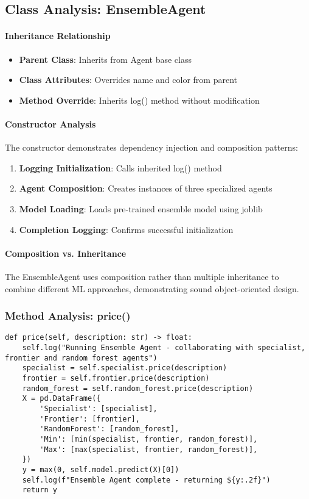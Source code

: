 \subsection{Class Analysis: EnsembleAgent}

\paragraph{Inheritance Relationship}
\begin{itemize}
\item \textbf{Parent Class}: Inherits from Agent base class
\item \textbf{Class Attributes}: Overrides name and color from parent
\item \textbf{Method Override}: Inherits log() method without modification
\end{itemize}

\paragraph{Constructor Analysis}
The constructor demonstrates dependency injection and composition patterns:

\begin{enumerate}
\item \textbf{Logging Initialization}: Calls inherited log() method
\item \textbf{Agent Composition}: Creates instances of three specialized agents
\item \textbf{Model Loading}: Loads pre-trained ensemble model using joblib
\item \textbf{Completion Logging}: Confirms successful initialization
\end{enumerate}

\paragraph{Composition vs. Inheritance}
The EnsembleAgent uses composition rather than multiple inheritance to combine different ML approaches, demonstrating sound object-oriented design.

\subsubsection{Method Analysis: price()}

\begin{lstlisting}[caption=Ensemble Price Prediction Method]
def price(self, description: str) -> float:
    self.log("Running Ensemble Agent - collaborating with specialist, frontier and random forest agents")
    specialist = self.specialist.price(description)
    frontier = self.frontier.price(description)
    random_forest = self.random_forest.price(description)
    X = pd.DataFrame({
        'Specialist': [specialist],
        'Frontier': [frontier], 
        'RandomForest': [random_forest],
        'Min': [min(specialist, frontier, random_forest)],
        'Max': [max(specialist, frontier, random_forest)],
    })
    y = max(0, self.model.predict(X)[0])
    self.log(f"Ensemble Agent complete - returning ${y:.2f}")
    return y
\end{lstlisting}

